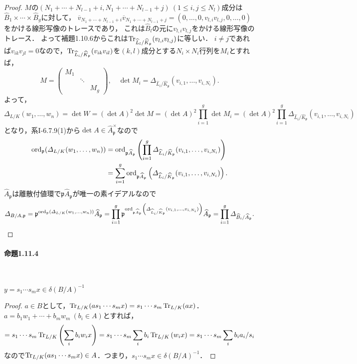 \begin{proof}
  $M$の$(N_1+\cdots+N_{l-1}+i,N_1+\cdots+N_{l-1}+j)\ (1\leq i,j\leq N_l)$成分は$\widehat{B}_1\times\cdots\times\widehat{B}_g$に対して，
  $\overline{v}_{N_1+\cdots+N_{l-1}+i}\overline{v}_{N_1+\cdots+N_{l-1}+j}=(0,\ldots,0,v_{l,i}v_{l,j},0,\ldots,0)$をかける線形写像のトレースであり，
  これは$\widehat{B}_l$の元に$v_{l,i}v_{l,j}$をかける線形写像のトレース．
  よって補題1.10.6からこれは$\operatorname{Tr}_{\widehat{L}_l/\widehat{K}_\mathfrak{p}}(v_{l,i}v_{l,j})$に等しい．
  $i\neq j$であれば$v_{ik}v_{jl}=0$なので，$\operatorname{Tr}_{\widehat{L}_i/\widehat{K}_\mathfrak{p}}(v_{ik}v_{il})$を$(k,l)$成分とする$N_i\times N_i$行列を$M_i$とすれば，
  \[
  M=
  \begin{pmatrix}
    M_1 &        & \\
    & \ddots & \\
    &        & M_g
  \end{pmatrix}
  ,\quad \det M_i = \varDelta_{\widehat{L}_i/\widehat{K}_\mathfrak{p}}(v_{i,1},\ldots,v_{i,N_i}).\]
  よって，
  \[\varDelta_{L/K}(w_1,\ldots,w_n) = \det W = (\det A)^2 \det M = (\det A)^2 \prod_{i=1}^g \det M_i = (\det A)^2 \prod_{i=1}^g\varDelta_{\widehat{L}_i/\widehat{K}_\mathfrak{p}}(v_{i,1},\ldots,v_{i,N_i})\]
  となり，系I-6.7.9(1)から$\det A \in \widehat{A}_\mathfrak{p}^\times$なので
  \begin{align*}
    \operatorname{ord}_{\mathfrak{p}}(\varDelta_{L/K}(w_1,\ldots,w_n)) &= \operatorname{ord}_{\mathfrak{p}\widehat{A}_\mathfrak{p}}\left(\prod_{i=1}^g\varDelta_{\widehat{L}_i/\widehat{K}_\mathfrak{p}}(v_{i,1},\ldots,v_{i,N_i})\right) \\
    &= \sum_{i = 1}^g\operatorname{ord}_{\mathfrak{p}\widehat{A}_\mathfrak{p}}\left(\varDelta_{\widehat{L}_i/\widehat{K}_\mathfrak{p}}(v_{i,1},\ldots,v_{i,N_i})\right).
  \end{align*}
  $\widehat{A}_\mathfrak{p}$は離散付値環で$\mathfrak{p}\widehat{A}_\mathfrak{p}$が唯一の素イデアルなので
  \[\varDelta_{B/A,\mathfrak{p}} = \mathfrak{p}^{\operatorname{ord}_{\mathfrak{p}}(\varDelta_{L/K}(w_1,\ldots,w_n))}\widehat{A}_\mathfrak{p} = \prod_{i = 1}^g\mathfrak{p}^{\operatorname{ord}_{\mathfrak{p}\widehat{A}_\mathfrak{p}}\left(\varDelta_{\widehat{L}_i/\widehat{K}_\mathfrak{p}}(v_{i,1},\ldots,v_{i,N_i})\right)}\widehat{A}_\mathfrak{p} = \prod_{i=1}^g\varDelta_{\widehat{B}_i/\widehat{A}_\mathfrak{p}}.\]
\end{proof}

\paragraph{命題1.11.4}~
\begin{screen}
  $y=s_1\cdots s_mx\in\delta(B/A)^{-1}$
\end{screen}
\begin{proof}
  $a\in B$として，$\operatorname{Tr}_{L/K}(as_1\cdots s_mx)=s_1\cdots s_m\operatorname{Tr}_{L/K}(ax)$．
  $a=b_1w_1+\cdots+b_mw_m\ (b_i\in A)$とすれば，
  \[=s_1\cdots s_m\operatorname{Tr}_{L/K}\left(\sum_ib_iw_ix\right)=s_1\cdots s_m\sum_ib_i\operatorname{Tr}_{L/K}\left(w_ix\right)=s_1\cdots s_m\sum_ib_ia_i/s_i\]
  なので$\operatorname{Tr}_{L/K}(as_1\cdots s_mx)\in A$．つまり，$s_1\cdots s_mx\in\delta(B/A)^{-1}$．
\end{proof}

